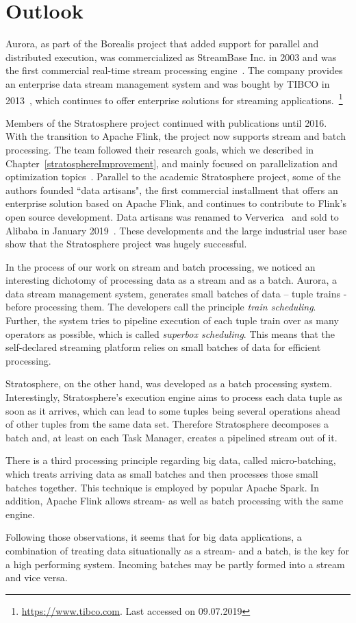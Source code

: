 \section{Outlook}\label{outlook}
Aurora, as part of the Borealis project that added support for parallel and distributed execution, was commercialized as StreamBase Inc. in 2003 and was the first commercial real-time stream processing engine~\cite{AuroraBorealis2016}. The company provides an enterprise data stream management system and was bought by TIBCO in 2013~\cite{TIBCObuysStreamBase}, which continues to offer enterprise solutions for streaming applications.~\footnote{\url{https://www.tibco.com}. Last accessed on 09.07.2019}

Members of the Stratosphere project continued with publications until 2016. With the transition to Apache Flink, the project now supports stream and batch processing. The team followed their research goals, which we described in Chapter~\ref{stratosphereImprovement}, and mainly focused on parallelization and optimization topics~\cite{StratospherePublications}. Parallel to the academic Stratosphere project, some of the authors founded ``data artisans", the first commercial installment that offers an enterprise solution based on Apache Flink, and continues to contribute to Flink's open source development. Data artisans was renamed to Ververica~\cite{VervericaAbout} and sold to Alibaba in January 2019~\cite{VervericaAlibaba}. These developments and the large industrial user base show that the Stratosphere project was hugely successful.

In the process of our work on stream and batch processing, we noticed an interesting dichotomy of processing data as a stream and as a batch. Aurora, a data stream management system, generates small batches of data – tuple trains - before processing them. The developers call the principle \textit{train scheduling}. Further, the system tries to pipeline execution of each tuple train over as many operators as possible, which is called \textit{superbox scheduling}. This means that the self-declared streaming platform relies on small batches of data for efficient processing. 

Stratosphere, on the other hand, was developed as a batch processing system. Interestingly, Stratosphere's execution engine aims to process each data tuple as soon as it arrives, which can lead to some tuples being several operations ahead of other tuples from the same data set. Therefore Stratosphere decomposes a batch and, at least on each Task Manager, creates a pipelined stream out of it.

There is a third processing principle regarding big data, called micro-batching, which treats arriving data as small batches and then processes those small batches together. This technique is employed by popular Apache Spark. In addition, Apache Flink allows stream- as well as batch processing with the same engine.

Following those observations, it seems that for big data applications, a combination of treating data situationally as a stream- and a batch, is the key for a high performing system. Incoming batches may be partly formed into a stream and vice versa.